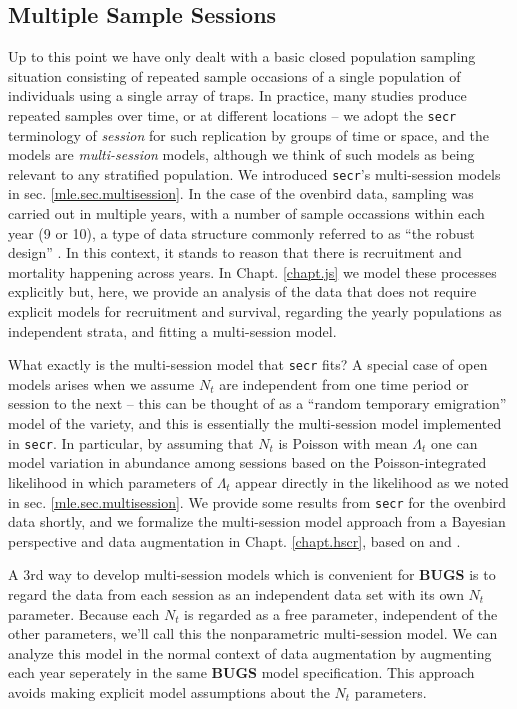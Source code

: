 \subsection{Multiple Sample Sessions}

Up to this point we have only dealt with a basic closed population
sampling situation consisting of repeated sample occasions of a single
population of individuals using a single array of traps. In practice,
many studies produce repeated samples over time, or at different
locations -- we adopt the \mbox{\tt secr} terminology of {\it session}
for such replication by groups of time or space, and the models are
{\it multi-session} models,  although we think of
such
models as being relevant to any stratified population. We introduced
\mbox{\tt secr}'s
multi-session models in sec. \ref{mle.sec.multisession}.
In the case of the ovenbird data, sampling was carried out
in multiple years, with a number of sample occassions within each year
(9 or 10), a type of data structure commonly referred to as ``the
robust design'' \citep{pollock:1982}.
In this context, it stands to reason that there is
recruitment and mortality happening across years. In
Chapt. \ref{chapt.js} we model these processes explicitly but, here,
we provide an analysis of the data that does not require explicit
models for recruitment and survival, regarding the yearly populations
as independent strata, and fitting a multi-session model.

What exactly is the multi-session model that \mbox{\tt secr} fits?
A special case of open models arises when we assume $N_{t}$ are
independent from one time period or session to the next -- this can be
thought of as a ``random temporary emigration'' model of the
\citet{kendall_etal:1997} variety, and this is essentially the
multi-session model implemented in \mbox{\tt secr}.  In particular, by
assuming that $N_{t}$ is Poisson with mean $\Lambda_{t}$ one can model
variation in abundance among sessions based on the Poisson-integrated
likelihood in which parameters of $\Lambda_{t}$ appear directly in the
likelihood as we noted in sec. \ref{mle.sec.multisession}.  We provide
some results from \mbox{\tt secr} for the ovenbird data shortly, and
we formalize the multi-session model approach from a Bayesian
perspective and data augmentation
in Chapt. \ref{chapt.hscr}, based on \citet{converse_royle:2012} and
\citet{converse_royle:2013}.

A 3rd way to develop multi-session models which is convenient for {\bf
  BUGS} is to regard the data from each session as an independent data
set with its own $N_{t}$ parameter. Because each $N_{t}$ is regarded
as a free parameter, independent of the other parameters, we'll call
this the nonparametric multi-session model.  
We can analyze this model
in the normal context of data augmentation by augmenting each year
seperately in the same {\bf BUGS} model specification. This approach
avoids making explicit model assumptions about the $N_{t}$
parameters. 

